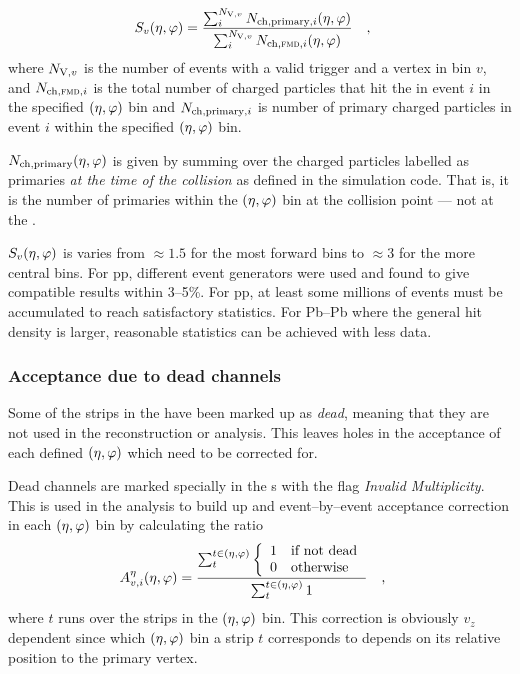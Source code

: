 \documentclass[11pt]{article}
\def\AlwaysText#1{\ifmmode\relax\text{#1}\else #1\fi}
\newcommand{\AbbrName}[1]{\AlwaysText{{\scshape #1}}}
\newcommand{\ESD}{\AbbrName{esd}}
\newcommand{\FMD}[1][]{\AbbrName{fmd\ifx|#1|\else#1\fi}}
\newcommand{\mult}[1][]{\ensuremath N_{\text{ch}#1}}
\newcommand{\N}[2]{{\ensuremath N_{#1#2}}}
\newcommand{\NV}[1][]{\N{\text{V}}{#1}}
\newcommand{\etaphi}{\ensuremath(\eta,\varphi)}
\newcommand{\DeadCh}{\ensuremath A^{\eta}_{v,i}\etaphi}
\newcommand{\SecMap}{\ensuremath S_v\etaphi}
\begin{document}
\begin{align}
  \label{eq:secondary}
  \SecMap{} &=
  \frac{\sum_i^{\NV[,v]}\mult[,\text{primary},i]\etaphi}{
    \sum_i^{\NV[,v]}\mult[,\text{\FMD{}},i]\etaphi}\quad,
\end{align}
where $\NV[,v]$ is the number of events with a valid trigger and a
vertex in bin $v$, and $\mult[,\FMD{},i]$ is the total number of
charged particles that hit the \FMD{} in event $i$ in the specified
$\etaphi$ bin and $\mult[,\text{primary},i]$ is number of
primary charged particles in event $i$ within the specified
$\etaphi$ bin.

$\mult[,\text{primary}]\etaphi$ is given by summing over the
charged particles labelled as primaries \emph{at the time of the
  collision} as defined in the simulation code.  That is, it is the
number of primaries within the $\etaphi$ bin at the collision
point --- not at the \FMD{}.

$\SecMap$ is varies from $\approx 1.5$ for the most forward bins to
$\approx 3$ for the more central bins.  For pp, different event
generators were used and found to give compatible results within
3--5\%.   For pp, at least some millions of events must be
accumulated to reach satisfactory statistics.  For Pb--Pb where the
general hit density is larger, reasonable statistics can be achieved
with less data.  

\subsubsection{Acceptance due to dead channels}

Some of the strips in the \FMD{} have been marked up as \emph{dead},
meaning that they are not used in the reconstruction or analysis.
This leaves holes in the acceptance of each defined $\etaphi$
which need to be corrected for.  

Dead channels are marked specially in the \ESD{}s with the flag
\textit{Invalid Multiplicity}.  This is used in the analysis to build
up and event--by--event acceptance correction in each $\etaphi$
bin by calculating the ratio
\begin{align}
  \label{eq:dead_channels} 
  \DeadCh{} &= 
  \frac{\sum_t^{t\in\etaphi}\left\{\begin{array}{cl}
        1 & \text{if not dead}\\
        0 & \text{otherwise}
      \end{array}\right.}{\sum_t^{t\in\etaphi} 1}\quad,
\end{align}
where $t$ runs over the strips in the $\etaphi$ bin.  This correction
is obviously $v_z$ dependent since which $\etaphi$ bin a strip $t$
corresponds to depends on its relative position to the primary vertex.
\end{document}
